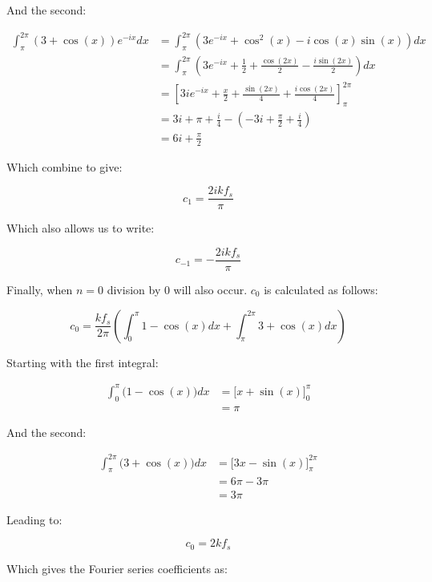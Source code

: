 \begin{appendices}
		And the second:
		
		\begin{align}
			\int_{\pi}^{2\pi} (3+\cos(x))e^{-ix} dx & = 
				\int_{\pi}^{2\pi} \left( 3e^{-ix} + \cos^{2}(x) - 
				i\cos(x)\sin(x) \right) dx \nonumber \\[0.6em]
			& = \int_{\pi}^{2\pi} \left( 3e^{-ix} + \frac{1}{2} + \frac{\cos(2x)}{2} - 
				\frac{i\sin(2x)}{2} \right) dx \nonumber \\[0.6em]
			& = \left[ 3ie^{-ix} + \frac{x}{2} + \frac{\sin(2x)}{4} + 
				\frac{i\cos(2x)}{4} \right]_{\pi}^{2\pi} \nonumber \\[0.6em]
			& = 3i + \pi + \frac{i}{4} - \left( -3i + \frac{\pi}{2} + \frac{i}{4} \right) \nonumber \\[0.6em]
			& = 6i + \frac{\pi}{2} \nonumber
		\end{align}

		Which combine to give:

		\[ c_{1} = \frac{2ikf_{s}}{\pi} \]

		Which also allows us to write:

		\[ c_{-1} = -\frac{2ikf_{s}}{\pi} \]

		Finally, when $n = 0$ division by 0 will also occur. $c_{0}$ is calculated as follows:

		\[ c_{0} = \frac{kf_{s}}{2\pi} \left( \int_{0}^{\pi} 1-\cos(x) dx
						      + \int_{\pi}^{2\pi} 3 + \cos(x) dx 
						      \right) \]

		Starting with the first integral:

		\begin{align}
			\int_{0}^{\pi} \bigl( 1 - \cos(x) \bigr) dx & = 
				\biggl[ x + \sin(x) \biggr]_{0}^{\pi} \nonumber \\[0.6em]
			& = \pi \nonumber
		\end{align}

		And the second:

		\begin{align}
			\int_{\pi}^{2\pi} \bigl( 3 + \cos(x) \bigr) dx & = 
				\biggl[ 3x - \sin(x) \biggr]_{\pi}^{2\pi} \nonumber \\[0.6em]
			& = 6\pi - 3\pi \nonumber \\[0.6em]
			& = 3\pi \nonumber
		\end{align}

		Leading to:

		\[ c_{0} = 2kf_{s} \]

		Which gives the Fourier series coefficients as:


\end{appendices}
